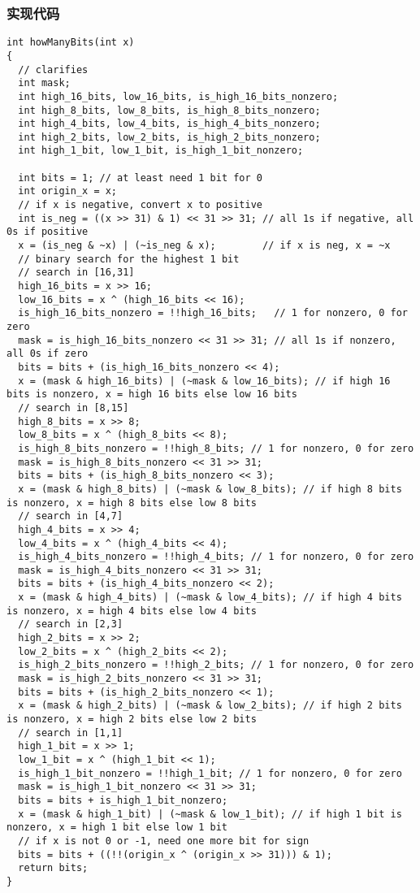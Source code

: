 \documentclass{article}
\begin{document}
\subsubsection{实现代码}
\begin{lstlisting}[caption={howManyBits}]
int howManyBits(int x)
{
  // clarifies
  int mask;
  int high_16_bits, low_16_bits, is_high_16_bits_nonzero;
  int high_8_bits, low_8_bits, is_high_8_bits_nonzero;
  int high_4_bits, low_4_bits, is_high_4_bits_nonzero;
  int high_2_bits, low_2_bits, is_high_2_bits_nonzero;
  int high_1_bit, low_1_bit, is_high_1_bit_nonzero;

  int bits = 1; // at least need 1 bit for 0
  int origin_x = x;
  // if x is negative, convert x to positive
  int is_neg = ((x >> 31) & 1) << 31 >> 31; // all 1s if negative, all 0s if positive
  x = (is_neg & ~x) | (~is_neg & x);        // if x is neg, x = ~x
  // binary search for the highest 1 bit
  // search in [16,31]
  high_16_bits = x >> 16;
  low_16_bits = x ^ (high_16_bits << 16);
  is_high_16_bits_nonzero = !!high_16_bits;   // 1 for nonzero, 0 for zero
  mask = is_high_16_bits_nonzero << 31 >> 31; // all 1s if nonzero, all 0s if zero
  bits = bits + (is_high_16_bits_nonzero << 4);
  x = (mask & high_16_bits) | (~mask & low_16_bits); // if high 16 bits is nonzero, x = high 16 bits else low 16 bits
  // search in [8,15]
  high_8_bits = x >> 8;
  low_8_bits = x ^ (high_8_bits << 8);
  is_high_8_bits_nonzero = !!high_8_bits; // 1 for nonzero, 0 for zero
  mask = is_high_8_bits_nonzero << 31 >> 31;
  bits = bits + (is_high_8_bits_nonzero << 3);
  x = (mask & high_8_bits) | (~mask & low_8_bits); // if high 8 bits is nonzero, x = high 8 bits else low 8 bits
  // search in [4,7]
  high_4_bits = x >> 4;
  low_4_bits = x ^ (high_4_bits << 4);
  is_high_4_bits_nonzero = !!high_4_bits; // 1 for nonzero, 0 for zero
  mask = is_high_4_bits_nonzero << 31 >> 31;
  bits = bits + (is_high_4_bits_nonzero << 2);
  x = (mask & high_4_bits) | (~mask & low_4_bits); // if high 4 bits is nonzero, x = high 4 bits else low 4 bits
  // search in [2,3]
  high_2_bits = x >> 2;
  low_2_bits = x ^ (high_2_bits << 2);
  is_high_2_bits_nonzero = !!high_2_bits; // 1 for nonzero, 0 for zero
  mask = is_high_2_bits_nonzero << 31 >> 31;
  bits = bits + (is_high_2_bits_nonzero << 1);
  x = (mask & high_2_bits) | (~mask & low_2_bits); // if high 2 bits is nonzero, x = high 2 bits else low 2 bits
  // search in [1,1]
  high_1_bit = x >> 1;
  low_1_bit = x ^ (high_1_bit << 1);
  is_high_1_bit_nonzero = !!high_1_bit; // 1 for nonzero, 0 for zero
  mask = is_high_1_bit_nonzero << 31 >> 31;
  bits = bits + is_high_1_bit_nonzero;
  x = (mask & high_1_bit) | (~mask & low_1_bit); // if high 1 bit is nonzero, x = high 1 bit else low 1 bit
  // if x is not 0 or -1, need one more bit for sign
  bits = bits + ((!!(origin_x ^ (origin_x >> 31))) & 1);
  return bits;
}
\end{lstlisting}
\end{document}
